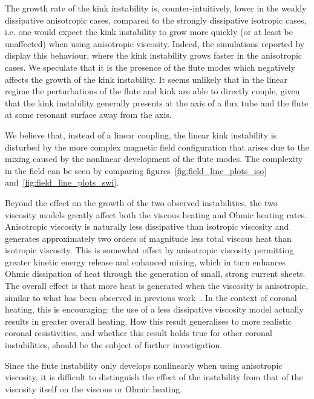 \documentclass[fleqn,usenatbib]{mnras}
\newcommand{\rev}[1]{{\color{red} {#1}}}
\newcommand{\newold}[2]{{#1}{}}
\begin{document}
\rev{The growth rate of the kink instability is, counter-intuitively, lower in the
weakly dissipative anisotropic cases, compared to the strongly dissipative
isotropic cases, i.e. one would expect the kink instability to grow more
quickly (or at least be unaffected) when using anisotropic viscosity. Indeed,
the simulations reported by~\citet{quinnEffectAnisotropicViscosity2020} display
this behaviour, where the kink instability grows \newold{}{(marginally)} faster in the
anisotropic cases. We speculate that it is the presence of the flute modes which
negatively affects the growth of the kink instability.} {It seems unlikely that
in the linear regime the perturbations of the flute and kink are able to
directly couple, given that the kink instability generally presents at the axis
of a flux tube and the flute at some resonant surface away from the
axis.} \rev{We believe that, instead of a linear coupling, the linear kink instability is
disturbed by the more complex magnetic field configuration that arises due to
the mixing caused by the nonlinear development of the flute modes. The
complexity in the field can be seen by comparing
figures~\ref{fig:field_line_plots_iso} and~\ref{fig:field_line_plots_swi}.

Beyond the effect on the growth of the two observed instabilities, the two
viscosity models greatly affect both the viscous heating and Ohmic heating
rates. Anisotropic viscosity is naturally less dissipative than isotropic
viscosity and generates approximately two orders of magnitude less total
viscous heat than isotropic viscosity. This is somewhat offset by anisotropic
viscosity permitting greater kinetic energy release and enhanced mixing, which
in turn enhances Ohmic dissipation of heat through the generation of small,
strong current sheets. The overall effect is that more heat is generated when
the viscosity is anisotropic, similar to what has been observed in previous
work~\citep{quinnEffectAnisotropicViscosity2020}. In the context of
coronal heating, this is encouraging: the use of a less dissipative viscosity
model actually results in greater overall heating. How this result generalises
to more realistic coronal resistivities, and whether this result holds true for
other coronal instabilities, should be the subject of further investigation.}

\rev{Since the flute instability only develops nonlinearly when using anisotropic viscosity, it is difficult to distinguish the effect of the instability from that of the viscosity itself on the viscous or Ohmic heating. \todo{finish this paragraph}}
\end{document}
